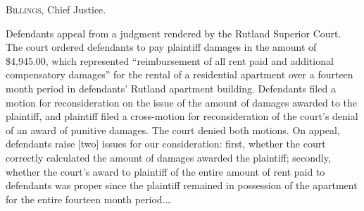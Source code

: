 
\textsc{Billings}, Chief Justice.

Defendants appeal from a judgment rendered by the Rutland Superior Court.  The
court ordered defendants to pay plaintiff damages in the amount of \$4,945.00,
which represented ``reimbursement of all rent paid and additional compensatory
damages'' for the rental of a residential apartment over a fourteen month
period in defendants' Rutland apartment building. Defendants filed a motion for
reconsideration on the issue of the amount of damages awarded to the plaintiff,
and plaintiff filed a cross-motion for reconsideration of the court's denial of
an award of punitive damages. The court denied both motions. On appeal,
defendants raise [two] issues for our consideration: first, whether the court
correctly calculated the amount of damages awarded the plaintiff; secondly,
whether the court's award to plaintiff of the entire amount of rent paid to
defendants was proper since the plaintiff remained in possession of the
apartment for the entire fourteen month period.\ldots

